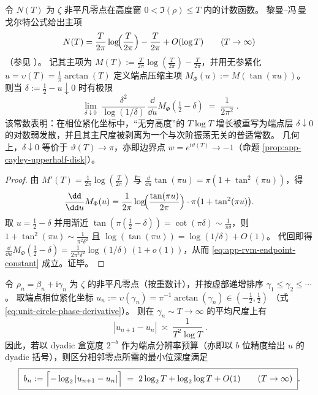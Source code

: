 

\begin{remark}\label{rem:app-rvm-endpoint-constant}
令 \(N(T)\) 为 \(\zeta\) 非平凡零点在高度窗 \(0<\Im(\rho)\le T\) 内的计数函数。
黎曼--冯\,曼戈尔特公式给出主项
\[
N(T)=\frac{T}{2\pi}\log\!\Bigl(\frac{T}{2\pi}\Bigr)-\frac{T}{2\pi}+O(\log T)\qquad(T\to\infty)
\]
（参见 \cite{Apostol1976}）。
记其主项为
\(
M(T):=\frac{T}{2\pi}\log(\frac{T}{2\pi})-\frac{T}{2\pi}
\)，并用无参紧化 \(u=\upsilon(T)=\frac{1}{\pi}\arctan(T)\) 定义端点压缩主项
\(
M_{\Phi}(u):=M(\tan(\pi u))
\)。
则当 \(\delta:=\tfrac12-u\downarrow 0\) 时有极限
\begin{equation}\label{eq:app-rvm-endpoint-constant}
\boxed{\;
\lim_{\delta\downarrow 0}\;
\frac{\delta^{2}}{\log(1/\delta)}\,
\frac{\dd}{\dd u}M_{\Phi}\!\left(\tfrac12-\delta\right)
\;=\;\frac{1}{2\pi^{2}}\; }.
\end{equation}
该常数表明：在相位紧化坐标中，“无穷高度”的 \(T\log T\) 增长被重写为端点层 \(\delta\downarrow 0\) 的对数弱发散，并且其主尺度被剥离为一个与次阶振荡无关的普适常数。
几何上，\(\delta\downarrow 0\) 等价于 \(\vartheta(T)\to\pi\)，亦即边界点 \(w=e^{\mathrm{i}\vartheta(T)}\to-1\)（命题 \ref{prop:app-cayley-upperhalf-disk}）。
\end{remark}
\begin{proof}
由 \(M'(T)=\frac{1}{2\pi}\log(\frac{T}{2\pi})\) 与 \(\frac{\dd}{\dd u}\tan(\pi u)=\pi(1+\tan^2(\pi u))\)，得
\[
\frac{\dd}{\dd u}M_{\Phi}(u)
=\frac{1}{2\pi}\log\!\Bigl(\frac{\tan(\pi u)}{2\pi}\Bigr)\cdot \pi\bigl(1+\tan^2(\pi u)\bigr).
\]
取 \(u=\tfrac12-\delta\) 并用渐近 \(\tan(\pi(\tfrac12-\delta))=\cot(\pi\delta)\sim \frac{1}{\pi\delta}\)，则
\(
1+\tan^2(\pi u)\sim \frac{1}{\pi^2\delta^2}
\)
且
\(
\log(\tan(\pi u))=\log(1/\delta)+O(1)
\)。
代回即得
\(
\frac{\dd}{\dd u}M_{\Phi}(\tfrac12-\delta)
=\frac{1}{2\pi^{2}\delta^{2}}\log(1/\delta)\,(1+o(1))
\)，从而 \eqref{eq:app-rvm-endpoint-constant} 成立。证毕。
\end{proof}

\begin{proposition}\label{prop:app-adjacent-zero-dyadic-resolution}
令 \(\rho_n=\beta_n+\mathrm{i}\gamma_n\) 为 \(\zeta\) 的非平凡零点（按重数计），并按虚部递增排序 \(\gamma_1\le \gamma_2\le\cdots\)。
取端点相位紧化坐标
\(
u_n:=\upsilon(\gamma_n)=\pi^{-1}\arctan(\gamma_n)\in(-\tfrac12,\tfrac12)
\)
（式 \eqref{eq:unit-circle-phase-derivative}）。
则在 \(\gamma_n\sim T\to\infty\) 的平均尺度上有
\begin{equation}\label{eq:app-adjacent-zero-u-gap-scale}
\boxed{\;
|u_{n+1}-u_n|\ \asymp\ \frac{1}{T^{2}\log T}\; }.
\end{equation}
因此，若以 dyadic 盒宽度 \(2^{-b}\) 作为端点分辨率预算（亦即以 \(b\) 位精度给出 \(u\) 的 dyadic 括号），则区分相邻零点所需的最小位深度满足
\begin{equation}\label{eq:app-adjacent-zero-dyadic-depth}
\boxed{\;
b_{n}:=\Bigl\lceil-\log_{2}|u_{n+1}-u_n|\Bigr\rceil
\;=\;2\log_{2}T+\log_{2}\log T+O(1)\qquad(T\to\infty)\; }.
\end{equation}
\end{proposition}

